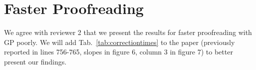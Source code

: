\documentclass[10pt,twocolumn,letterpaper]{article}
\begin{document}
\begin{table}[h]
\caption{Training data of membrane detection vs. training data of GP (for supplemental material).}%
\label{tab:trainingdata}
\end{table}


\section{Faster Proofreading}
We agree with reviewer 2 that we present the results for faster proofreading with GP poorly. 
We will add Tab.~\ref{tab:correctiontimes} to the paper (previously reported in lines 756-765, slopes in figure 6, column 3 in figure 7) to better present our findings.
\end{document}
